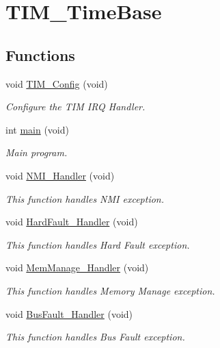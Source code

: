 \hypertarget{group___t_i_m___time_base}{\section{T\-I\-M\-\_\-\-Time\-Base}
\label{group___t_i_m___time_base}
}
\subsection*{Functions}
\begin{DoxyCompactItemize}
\item 
void \hyperlink{group___t_i_m___time_base_ga54ca0fe4856d5d1a9e66faf7141c4d5b}{T\-I\-M\-\_\-\-Config} (void)
\begin{DoxyCompactList}\small\item\em Configure the T\-I\-M I\-R\-Q Handler. \end{DoxyCompactList}\item 
int \hyperlink{group___t_i_m___time_base_ga840291bc02cba5474a4cb46a9b9566fe}{main} (void)
\begin{DoxyCompactList}\small\item\em Main program. \end{DoxyCompactList}\item 
void \hyperlink{group___t_i_m___time_base_ga6ad7a5e3ee69cb6db6a6b9111ba898bc}{N\-M\-I\-\_\-\-Handler} (void)
\begin{DoxyCompactList}\small\item\em This function handles N\-M\-I exception. \end{DoxyCompactList}\item 
void \hyperlink{group___t_i_m___time_base_ga2bffc10d5bd4106753b7c30e86903bea}{Hard\-Fault\-\_\-\-Handler} (void)
\begin{DoxyCompactList}\small\item\em This function handles Hard Fault exception. \end{DoxyCompactList}\item 
void \hyperlink{group___t_i_m___time_base_ga3150f74512510287a942624aa9b44cc5}{Mem\-Manage\-\_\-\-Handler} (void)
\begin{DoxyCompactList}\small\item\em This function handles Memory Manage exception. \end{DoxyCompactList}\item 
void \hyperlink{group___t_i_m___time_base_ga850cefb17a977292ae5eb4cafa9976c3}{Bus\-Fault\-\_\-\-Handler} (void)
\begin{DoxyCompactList}\small\item\em This function handles Bus Fault exception. \end{DoxyCompactList}\item 

\end{DoxyCompactItemize}
